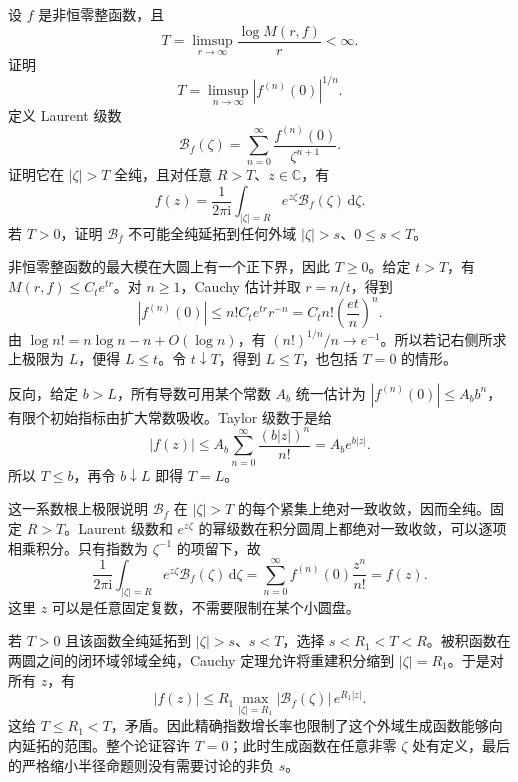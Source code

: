 \begin{exercise}[导数生成函数与指数增长]\label{b3:ex:19-draft-06}
设 \(f\) 是非恒零整函数，且
\[
 T=\limsup_{r\to\infty}\frac{\log M(r,f)}r<\infty.
\]
证明
\[
 T=\limsup_{n\to\infty}|f^{(n)}(0)|^{1/n}.
\]
定义 Laurent 级数
\[
 \mathcal B_f(\zeta)=\sum_{n=0}^\infty\frac{f^{(n)}(0)}{\zeta^{n+1}}.
\]
证明它在 \(|\zeta|>T\) 全纯，且对任意 \(R>T\)、\(z\in\mathbb C\)，有
\[
 f(z)=\frac1{2\pi\mathrm i}\int_{|\zeta|=R}e^{z\zeta}\mathcal B_f(\zeta)\,\mathrm d\zeta.
\]
若 \(T>0\)，证明 \(\mathcal B_f\) 不可能全纯延拓到任何外域 \(|\zeta|>s\)、\(0\le s<T\)。
\end{exercise}
\begin{solution}
非恒零整函数的最大模在大圆上有一个正下界，因此 \(T\ge0\)。给定 \(t>T\)，有 \(M(r,f)\le C_t e^{tr}\)。对 \(n\ge1\)，Cauchy 估计并取 \(r=n/t\)，得到
\[
 |f^{(n)}(0)|\le n!C_t e^{tr}r^{-n}
 =C_t n!\left(\frac{et}{n}\right)^n.
\]
由 \(\log n!=n\log n-n+O(\log n)\)，有 \((n!)^{1/n}/n\to e^{-1}\)。所以若记右侧所求上极限为 \(L\)，便得 \(L\le t\)。令 \(t\downarrow T\)，得到 \(L\le T\)，也包括 \(T=0\) 的情形。

反向，给定 \(b>L\)，所有导数可用某个常数 \(A_b\) 统一估计为 \(|f^{(n)}(0)|\le A_b b^n\)，有限个初始指标由扩大常数吸收。Taylor 级数于是给
\[
 |f(z)|\le A_b\sum_{n=0}^\infty\frac{(b|z|)^n}{n!}=A_b e^{b|z|}.
\]
所以 \(T\le b\)，再令 \(b\downarrow L\) 即得 \(T=L\)。

这一系数根上极限说明 \(\mathcal B_f\) 在 \(|\zeta|>T\) 的每个紧集上绝对一致收敛，因而全纯。固定 \(R>T\)。Laurent 级数和 \(e^{z\zeta}\) 的幂级数在积分圆周上都绝对一致收敛，可以逐项相乘积分。只有指数为 \(\zeta^{-1}\) 的项留下，故
\[
 \frac1{2\pi\mathrm i}\int_{|\zeta|=R}e^{z\zeta}\mathcal B_f(\zeta)\,\mathrm d\zeta
 =\sum_{n=0}^\infty f^{(n)}(0)\frac{z^n}{n!}=f(z).
\]
这里 \(z\) 可以是任意固定复数，不需要限制在某个小圆盘。

若 \(T>0\) 且该函数全纯延拓到 \(|\zeta|>s\)、\(s<T\)，选择 \(s<R_1<T<R\)。被积函数在两圆之间的闭环域邻域全纯，Cauchy 定理允许将重建积分缩到 \(|\zeta|=R_1\)。于是对所有 \(z\)，有
\[
 |f(z)|\le R_1\max_{|\zeta|=R_1}|\mathcal B_f(\zeta)|\,e^{R_1|z|}.
\]
这给 \(T\le R_1<T\)，矛盾。因此精确指数增长率也限制了这个外域生成函数能够向内延拓的范围。整个论证容许 \(T=0\)；此时生成函数在任意非零 \(\zeta\) 处有定义，最后的严格缩小半径命题则没有需要讨论的非负 \(s\)。
\end{solution}

